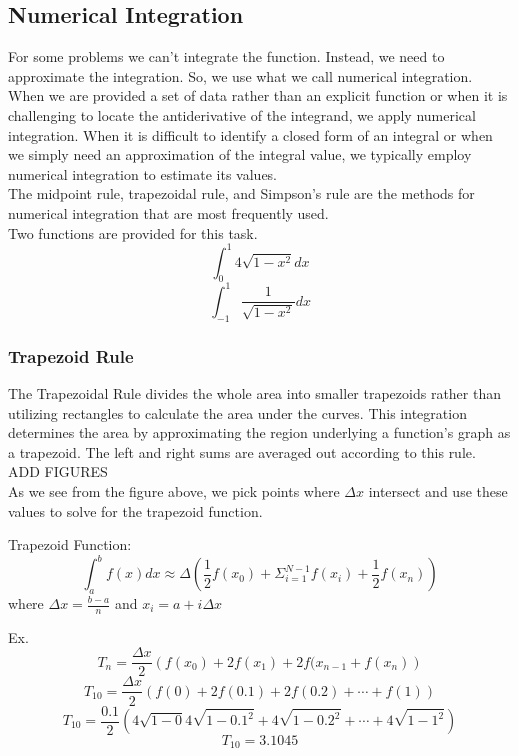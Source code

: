 \documentclass[11pt]{article}
\begin{document}
\subsection{Numerical Integration}\label{S:3.1}
For some problems we can’t integrate the function. Instead, we need to approximate the integration. So, we use what we call numerical integration. When we are provided a set of data rather than an explicit function or when it is challenging to locate the antiderivative of the integrand, we apply numerical integration. When it is difficult to identify a closed form of an integral or when we simply need an approximation of the integral value, we typically employ numerical integration to estimate its values.\\

The midpoint rule, trapezoidal rule, and Simpson's rule are the methods for numerical integration that are most frequently used.\\

Two functions are provided for this task.
\[
	\int_0^1 4\sqrt{1-x^2}dx
\]
\[
	\int_{-1}^{1} \frac{1}{\sqrt{1-x^2}}dx
\]

\subsubsection*{Trapezoid Rule}
The Trapezoidal Rule divides the whole area into smaller trapezoids rather than utilizing rectangles to calculate the area under the curves. This integration determines the area by approximating the region underlying a function's graph as a trapezoid. The left and right sums are averaged out according to this rule.\\

ADD FIGURES\\

As we see from the figure above, we pick points where $\Delta x$ intersect and use these values to solve for the trapezoid function.

Trapezoid Function:
\[
	\int_a^b f(x)dx \approx \Delta \left(\frac{1}{2} f(x_0) + \Sigma_{i=1}^{N-1}f(x_i)+\frac{1}{2}f(x_n)\right)
\]
where $\Delta x = \frac{b - a}{n}$ and $x_i = a + i\Delta x$

Ex.\\
\[T_n=\frac{\Delta x}{2}\left(f(x_0) + 2f(x_1) + 2f(x_{n-1} + f(x_n)\right)\]
\[T_{10}=\frac{\Delta x}{2}\left(f(0) + 2f(0.1) + 2f(0.2) + \cdots + f(1)\right)\]
\[T_{10}=\frac{0.1}{2}\left(4\sqrt{1-0} 4\sqrt{1-0.1^2} + 4\sqrt{1-0.2^2}+\cdots+4\sqrt{1-1^2}\right)\]
\[T_{10}=3.1045\]
\end{document}
